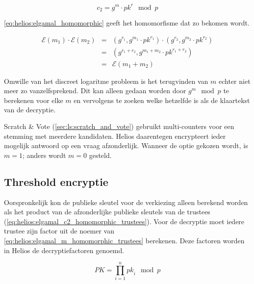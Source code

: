 \begin{equation}
  \label{eq:helios:elgamal_c2_homomorphic}
  c_2 = g^m \cdot {pk}^r \mod{p}
\end{equation}

\ref{eq:helios:elgamal_homomorphic} geeft het homomorfisme dat zo bekomen wordt.

\begin{equation}
  \label{eq:helios:elgamal_homomorphic}
  \begin{array}{lcl}
    \mathcal{E}(m_1) \cdot \mathcal{E}(m_2) &=& (g^{r_1}, g^{m_1} \cdot {pk}^{r_1}) \cdot (g^{r_2}, g^{m_2} \cdot {pk}^{r_2}) \\
      &=& (g^{r_1 + r_2}, g^{m_1 + m_2} \cdot {pk}^{r_1 + r_2}) \\
      &=& \mathcal{E}(m_1 + m_2)
  \end{array}
\end{equation}

\npar Omwille van het discreet logaritme probleem is het terugvinden van $m$ echter niet meer zo vanzelfsprekend.\cite{menezes_vanstone_oorschot_handbook_of_applied_cryptography} Dit kan alleen gedaan worden door $g^m \mod{p}$ te berekenen voor elke $m$ en vervolgens te zoeken welke hetzelfde is als de klaartekst van de decryptie.

\npar Scratch \& Vote (\ref{sec:ls:scratch_and_vote}) gebruikt multi-counters voor een stemming met meerdere kandidaten. Helios daarentegen encrypteert ieder mogelijk antwoord op een vraag afzonderlijk. Wanneer de optie gekozen wordt, is $m = 1$; anders wordt $m = 0$ gesteld.

\subsection{Threshold encryptie}
\label{sec:helios:threshold_encryptie}


Oorspronkelijk kon de publieke sleutel voor de verkiezing alleen berekend worden als het product van de afzonderlijke publieke sleutels van de trustees (\ref{eq:helios:elgamal_c2_homomorphic_trustees}). Voor de decryptie moet iedere trustee zijn factor uit de noemer van \ref{eq:helios:elgamal_m_homomorphic_trustees} berekenen. Deze factoren worden in Helios de decryptiefactoren genoemd.

\begin{equation}
  \label{eq:helios:elgamal_c2_homomorphic_trustees}
  PK = \prod_{i=1}^n{{pk}_i} \mod{p}
\end{equation}

